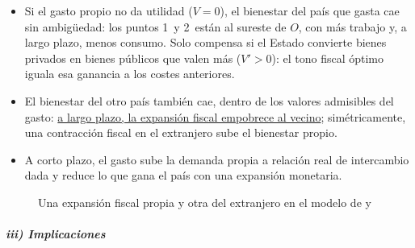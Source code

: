 \documentclass[11pt]{article}
\begin{document}
\begin{itemize}
\begin{itemize}
  \item Si el gasto propio no da utilidad ($V=0$), el bienestar del país que gasta cae sin ambigüedad: los puntos 1~y 2~están al sureste de $O$, con más trabajo y, a largo plazo, menos consumo. Solo compensa si el Estado convierte bienes privados en bienes públicos que valen más ($V'>0$): el tono fiscal óptimo iguala esa ganancia a los costes anteriores.
  \item El bienestar del otro país también cae, dentro de los valores admisibles del gasto: \uline{a largo plazo, la expansión fiscal empobrece al vecino}; simétricamente, una contracción fiscal en el extranjero sube el bienestar propio.
  \item A corto plazo, el gasto sube la demanda propia a relación real de intercambio dada y reduce lo que gana el país con una expansión monetaria.
  \end{itemize}
\end{itemize}

\begin{figure}[H]
\centering
\caption{Una expansión fiscal propia y otra del extranjero en el modelo de  y }\label{fig:cp-fiscal}
\end{figure}

\subparagraph{iii) Implicaciones}
\end{document}
